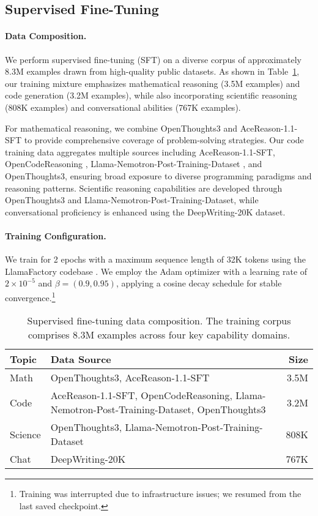 \documentclass[]{bytedance_seed}
\newcommand{\1}{\mathbf{1}}
\begin{document}
\subsection{Supervised Fine-Tuning}


\paragraph{Data Composition.} We perform supervised fine-tuning (SFT) on a diverse corpus of approximately 8.3M examples drawn from high-quality public datasets. As shown in Table~\ref{tab:sft_data}, our training mixture emphasizes mathematical reasoning (3.5M examples) and code generation (3.2M examples), while also incorporating scientific reasoning (808K examples) and conversational abilities (767K examples). 

For mathematical reasoning, we combine OpenThoughts3 \citep{guha2025openthoughts} and AceReason-1.1-SFT \citep{liu2025acereason} to provide comprehensive coverage of problem-solving strategies. Our code training data aggregates multiple sources including AceReason-1.1-SFT, OpenCodeReasoning \citep{ahmad2025opencodereasoning}, Llama-Nemotron-Post-Training-Dataset \citep{bercovich2025llama}, and OpenThoughts3, ensuring broad exposure to diverse programming paradigms and reasoning patterns. Scientific reasoning capabilities are developed through OpenThoughts3 and Llama-Nemotron-Post-Training-Dataset, while conversational proficiency is enhanced using the DeepWriting-20K \citep{wang2025reverse} dataset.

\paragraph{Training Configuration.} We train for 2 epochs with a maximum sequence length of 32K tokens using the LlamaFactory codebase \citep{zheng2024llamafactory}. We employ the Adam optimizer with a learning rate of $2 \times 10^{-5}$ and $\beta = (0.9, 0.95)$, applying a cosine decay schedule for stable convergence.\footnote{Training was interrupted due to infrastructure issues; we resumed from the last saved checkpoint.}

\begin{table}[htbp]
    \centering
    \begin{tabular}{l|p{10cm}|r}
    \toprule
       Topic  & Data Source & Size \\ \midrule
    Math   &  OpenThoughts3, AceReason-1.1-SFT & 3.5M \\
    Code   & AceReason-1.1-SFT, OpenCodeReasoning, Llama-Nemotron-Post-Training-Dataset, OpenThoughts3 & 3.2M \\ 
    Science & OpenThoughts3, Llama-Nemotron-Post-Training-Dataset & 808K \\
    Chat & DeepWriting-20K & 767K \\ \bottomrule
    \end{tabular}
    \caption{Supervised fine-tuning data composition. The training corpus comprises 8.3M examples across four key capability domains.}
    \label{tab:sft_data}
\end{table}
\end{document}
